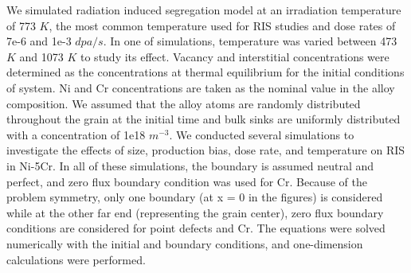 \documentclass[utf8]{frontiersSCNS} %
\begin{document}
We simulated radiation induced segregation model at an irradiation temperature of 773 $K$, the most common temperature used for RIS studies \citep{allen_thermal_2007,wharry_systematic_2013,barnard_ab_2014,barr_grain_2015} and dose rates of 7e-6 and 1e-3 $dpa/s$. In one of simulations, temperature was varied between 473 $K$ and 1073 $K$ to study its effect. Vacancy and interstitial concentrations were determined as the concentrations at thermal equilibrium for the initial conditions of system. Ni and Cr concentrations are taken as the nominal value in the alloy composition. We assumed that the alloy atoms are randomly distributed throughout the grain at the initial time and bulk sinks are uniformly distributed with a concentration of 1e18 $m^{-3}$. We conducted several simulations to investigate the effects of size, production bias, dose rate, and temperature on RIS in Ni-5Cr. In all of these simulations, the boundary is assumed neutral and perfect, and zero flux boundary condition was used for Cr. Because of the problem symmetry, only one boundary (at x = 0 in the figures) is considered while at the other far end (representing the grain center), zero flux boundary conditions are considered for point defects and Cr. The equations were solved numerically with the initial and boundary conditions, and one-dimension calculations were performed.
\end{document}
